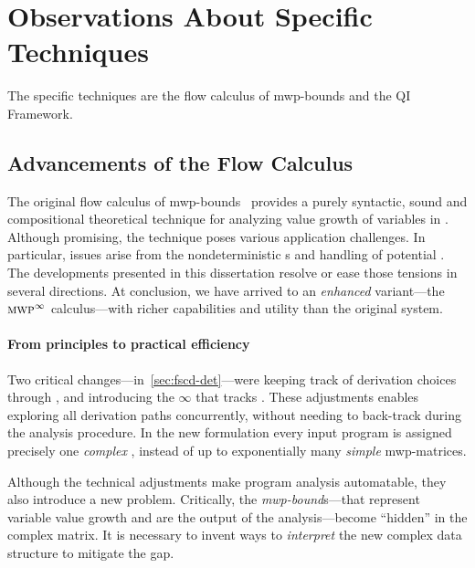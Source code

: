 \section{Observations About Specific Techniques}
\label{sec:res-specific}

The specific techniques are the flow calculus of mwp-bounds and the QI
Framework.

\subsection{Advancements of the Flow Calculus}
\label{subsec:res-flow-calc}

The original flow calculus of mwp-bounds~\cite{jones2009}
provides a purely syntactic, sound and
compositional theoretical technique for analyzing value
growth of variables in . Although promising, the
technique poses various application challenges. In particular, issues arise from
the nondeterministic s and handling of
potential . The developments presented in this
dissertation resolve or ease those tensions in several directions. At
conclusion, we have arrived to an \emph{enhanced} variant---\ie the
\(\textnormal{\textsc{mwp}}^\infty\) calculus---with richer capabilities and utility than the
original system.

\paragraph*{From principles to practical efficiency}
Two critical changes---in~\autoref{sec:fscd-det}---were keeping track of
derivation choices through \emph{}, and introducing
the  \(\infty\) that tracks . These adjustments enables exploring all derivation paths
{concurrently}, without needing to back-track during the analysis procedure. In
the new formulation every input program is assigned precisely one \emph{complex}
, instead of up to exponentially many \emph{simple} mwp-matrices.

Although the technical adjustments make program analysis automatable, they also
introduce a new problem. Critically, the \emph{mwp-bound}s---that represent
variable value growth and are the output of the analysis---become
\enquote{hidden} in the complex matrix. It is necessary to invent ways to
\emph{interpret} the new complex data structure to mitigate the gap.

